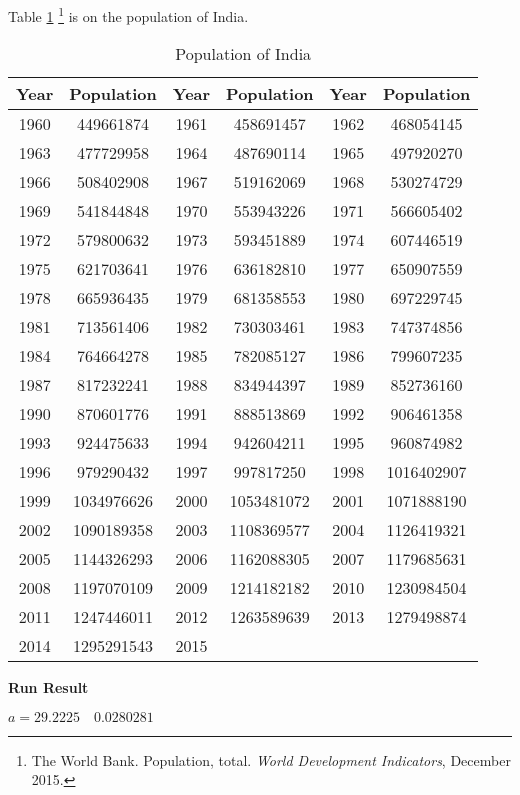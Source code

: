 \documentclass[tcn = 45538, sheet = true, abstract = true]{mcmthesis}
\begin{document}
Table \ref{tab:populationOfIndia}
\footnote{The World Bank. 
Population, total. 
\emph{World Development Indicators}, 
December 2015.}
is on the population of India.
\begin{table}[]
\centering
\begin{tabular}{@{}cc|cc|cc@{}}
\toprule
Year & Population & Year & Population & Year & Population \\ \midrule
1960 & 449661874 & 1961 & 458691457 & 1962 & 468054145 \\
1963 & 477729958 & 1964 & 487690114 & 1965 & 497920270 \\
1966 & 508402908 & 1967 & 519162069 & 1968 & 530274729 \\
1969 & 541844848 & 1970 & 553943226 & 1971 & 566605402 \\
1972 & 579800632 & 1973 & 593451889 & 1974 & 607446519 \\
1975 & 621703641 & 1976 & 636182810 & 1977 & 650907559 \\
1978 & 665936435 & 1979 & 681358553 & 1980 & 697229745 \\
1981 & 713561406 & 1982 & 730303461 & 1983 & 747374856 \\
1984 & 764664278 & 1985 & 782085127 & 1986 & 799607235 \\
1987 & 817232241 & 1988 & 834944397 & 1989 & 852736160 \\
1990 & 870601776 & 1991 & 888513869 & 1992 & 906461358 \\
1993 & 924475633 & 1994 & 942604211 & 1995 & 960874982 \\
1996 & 979290432 & 1997 & 997817250 & 1998 & 1016402907 \\
1999 & 1034976626 & 2000 & 1053481072 & 2001 & 1071888190 \\
2002 & 1090189358 & 2003 & 1108369577 & 2004 & 1126419321 \\
2005 & 1144326293 & 2006 & 1162088305 & 2007 & 1179685631 \\
2008 & 1197070109 & 2009 & 1214182182 & 2010 & 1230984504 \\
2011 & 1247446011 & 2012 & 1263589639 & 2013 & 1279498874 \\
2014 & 1295291543 & 2015 & & & \\ \bottomrule
\end{tabular}
\caption{Population of India}
\label{tab:populationOfIndia}
\end{table}

\textbf{Run Result}

$a = 29.2225 \quad 0.0280281$
\end{document}
